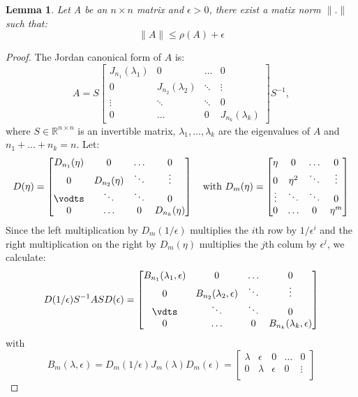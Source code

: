 \documentclass[a4paper,11pt]{report}
\newtheorem{lemma}[theorem]{Lemma}
\newcommand{\R}{{\mathbb R}}
\begin{document}
\begin{lemma}\label{eigennorm}
  Let A be an $n \times n$ matrix and $\epsilon > 0$, there exist a matix norm $\|. \|$ 
  such that:
  $$\|A\| \leq \rho(A) + \epsilon$$
\end{lemma}
\begin{proof}
  The Jordan canonical form of $A$ is:
  $$A = S \begin{bmatrix}
  J_{n_1}(\lambda_1) & 0 & \ldots & 0 \\
  0 & J_{n_2}(\lambda_2) & \ddots & \vdots \\
  \vdots & \ddots & \ddots & 0\\
  0 & \ldots & 0 & J_{n_k}(\lambda_k)
  \end{bmatrix}S^{-1},$$
  where $S \in \R^{n\times n}$ is an invertible matrix, $\lambda_1, \ldots, \lambda_k$ 
  are the eigenvalues of $A$ and $n_1 + \ldots + n_k = n$. Let:
  $$D(\eta) = \begin{bmatrix}
  D_{n_1}(\eta) & 0 & \ldots & 0 \\
  0 & D_{n_2}(\eta) & \ddots & \vdots \\
  \vodts & \ddots & \ddots & 0\\
  0 & \ldots & 0 & D_{n_k}(\eta)
  \end{bmatrix}\quad \text{with } D_m(\eta)= \begin{bmatrix}
  \eta & 0 & \ldots & 0 \\
  0 & \eta^2 & \ddots & \vdots\\
  \vdots & \ddots & \ddots & 0 \\
  0 & \ldots & 0 & \eta^m
  \end{bmatrix}$$
  Since the left multiplication by $D_m(1/\epsilon)$ multiplies the $i$th row by $1/\epsilon^i$ 
  and the right multiplication on the right by $D_m(\eta)$ multiplies the $j$th 
  colum by $\epsilon^j$, we calculate:
  $$D(1/\epsilon)S^{-1}ASD(\epsilon)=\begin{bmatrix}
  B_{n_1}(\lambda_1, \epsilon) & 0 & \ldots & 0 \\
  0 & B_{n_2}(\lambda_2, \epsilon) & \ddots & \vdots \\
  \vdts & \ddots & \ddots & 0\\
  0 & \ldots & 0 & B_{n_k}(\lambda_k, \epsilon)  \end{bmatrix}$$
  with 
  $$B_m(\lambda, \epsilon) = D_m(1/\epsilon)J_m(\lambda)D_m(\epsilon)=
  \begin{bmatrix}
   \lambda & \epsilon &  0 & \ldots & 0 \\
  0 & \lambda & \epsilon &  0 & \vdots \\

\end{bmatrix}$$
\end{proof}
\end{document}
